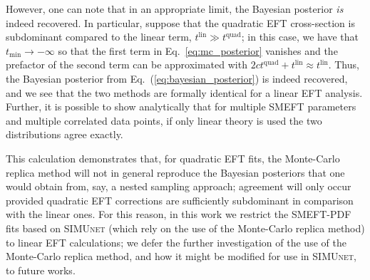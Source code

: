 \documentclass[withindex,glossary]{cam-thesis}
\newcommand{\simunet}{\textsc{SIMUnet}}
\begin{document}
However, one can note that in an appropriate limit, the Bayesian posterior \textit{is} indeed recovered.
In particular, suppose that the quadratic EFT cross-section is subdominant
compared to the linear term, $t^{\text{lin}} \gg t^{\text{quad}}$; in this case, we have that
$t_{\text{min}} \rightarrow -\infty$ so that the first term in Eq.~\eqref{eq:mc_posterior} vanishes
and the prefactor of the second term can be approximated with $2ct^{\text{quad}} + t^{\text{lin}} \approx t^{\text{lin}}$. 
Thus, the Bayesian posterior from Eq.~(\ref{eq:bayesian_posterior}) is indeed recovered, and we 
see that the two methods are formally identical for a linear EFT analysis.
%
Further, it is possible to show analytically that for multiple SMEFT parameters and multiple correlated data points, 
if only linear theory is used the two distributions agree exactly.


This calculation demonstrates that, for quadratic EFT fits, the Monte-Carlo replica method
will not in general reproduce the Bayesian posteriors that one would obtain from, say, a 
nested sampling approach; agreement will only occur provided quadratic EFT corrections 
are sufficiently subdominant in comparison with the linear ones.
%
For this reason, in this work we restrict the SMEFT-PDF fits based on \simunet{} (which rely
on the use of the Monte-Carlo replica method) to linear EFT calculations;
we defer the further investigation of the use of the Monte-Carlo replica method, and how
it might be modified for use in \simunet{}, to future works. 
\end{document}
